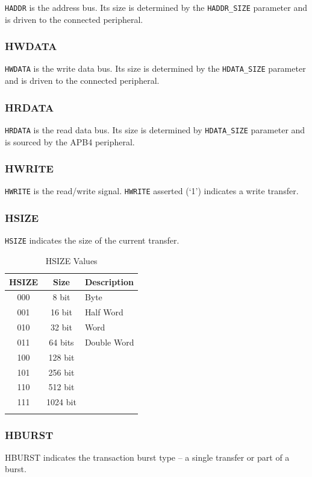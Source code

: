 \documentclass[]{article}
\begin{document}
\texttt{HADDR} is the address bus. Its size is determined by the
\texttt{HADDR\_SIZE} parameter and is driven to the connected
peripheral.

\subsubsection{HWDATA}

\texttt{HWDATA} is the write data bus. Its size is determined by the
\texttt{HDATA\_SIZE} parameter and is driven to the connected
peripheral.

\subsubsection{HRDATA}

\texttt{HRDATA} is the read data bus. Its size is determined by
\texttt{HDATA\_SIZE} parameter and is sourced by the APB4 peripheral.

\subsubsection{HWRITE}

\texttt{HWRITE} is the read/write signal. \texttt{HWRITE} asserted (`1')
indicates a write transfer.

\subsubsection{HSIZE}

\texttt{HSIZE} indicates the size of the current transfer.

\begin{longtable}[]{@{}ccl@{}}
\toprule
\textbf{HSIZE} & \textbf{Size} & \textbf{Description}\tabularnewline
\midrule
\endhead
000 & 8 bit & Byte\tabularnewline
001 & 16 bit & Half Word\tabularnewline
010 & 32 bit & Word\tabularnewline
011 & 64 bits & Double Word\tabularnewline
100 & 128 bit &\tabularnewline
101 & 256 bit &\tabularnewline
110 & 512 bit &\tabularnewline
111 & 1024 bit &\tabularnewline
\bottomrule
\caption{HSIZE Values}
\label{tab:HSIZE}
\end{longtable}

\subsubsection{HBURST}

HBURST indicates the transaction burst type -- a single transfer or part
of a burst.
\end{document}
